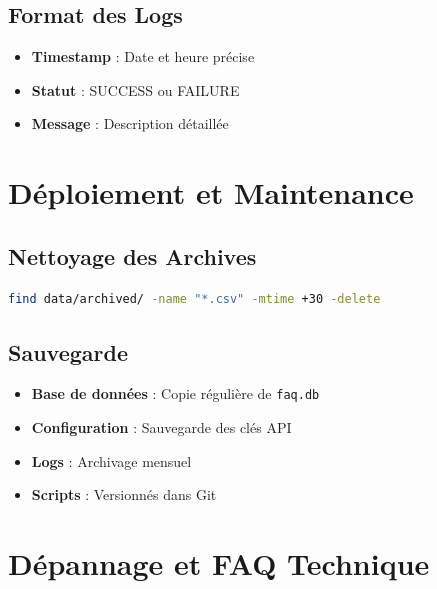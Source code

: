 \documentclass[11pt,a4paper]{article}
\begin{document}
\subsection{Format des Logs}
\begin{itemize}
    \item \textbf{Timestamp} : Date et heure précise
    \item \textbf{Statut} : SUCCESS ou FAILURE
    \item \textbf{Message} : Description détaillée
\end{itemize}

\section{Déploiement et Maintenance}
\label{sec:deployment}

\subsection{Nettoyage des Archives}
\begin{lstlisting}[language=bash]
% Suppression des archives de plus de 30 jours
find data/archived/ -name "*.csv" -mtime +30 -delete
\end{lstlisting}

\subsection{Sauvegarde}
\begin{itemize}
    \item \textbf{Base de données} : Copie régulière de \texttt{faq.db}
    \item \textbf{Configuration} : Sauvegarde des clés API
    \item \textbf{Logs} : Archivage mensuel
    \item \textbf{Scripts} : Versionnés dans Git
\end{itemize}

\section{Dépannage et FAQ Technique}
\label{sec:troubleshooting}
\end{document}
